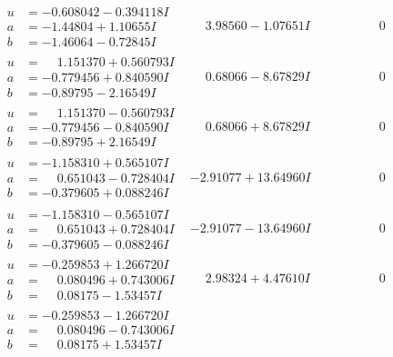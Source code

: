 \documentclass[1p]{elsarticle_modified}
\theoremstyle{definition}
\begin{document}
$$\begin{array}{c|c|c}
 \hline 
\begin{aligned}
u &= -0.608042 - 0.394118 I \\
a &= -1.44804 + 1.10655 I \\
b &= -1.46064 - 0.72845 I\end{aligned}
 & \phantom{-}3.98560 - 1.07651 I & \phantom{-0.000000 } 0 \\ \hline\begin{aligned}
u &= \phantom{-}1.151370 + 0.560793 I \\
a &= -0.779456 + 0.840590 I \\
b &= -0.89795 - 2.16549 I\end{aligned}
 & \phantom{-}0.68066 - 8.67829 I & \phantom{-0.000000 } 0 \\ \hline\begin{aligned}
u &= \phantom{-}1.151370 - 0.560793 I \\
a &= -0.779456 - 0.840590 I \\
b &= -0.89795 + 2.16549 I\end{aligned}
 & \phantom{-}0.68066 + 8.67829 I & \phantom{-0.000000 } 0 \\ \hline\begin{aligned}
u &= -1.158310 + 0.565107 I \\
a &= \phantom{-}0.651043 - 0.728404 I \\
b &= -0.379605 + 0.088246 I\end{aligned}
 & -2.91077 + 13.64960 I & \phantom{-0.000000 } 0 \\ \hline\begin{aligned}
u &= -1.158310 - 0.565107 I \\
a &= \phantom{-}0.651043 + 0.728404 I \\
b &= -0.379605 - 0.088246 I\end{aligned}
 & -2.91077 - 13.64960 I & \phantom{-0.000000 } 0 \\ \hline\begin{aligned}
u &= -0.259853 + 1.266720 I \\
a &= \phantom{-}0.080496 + 0.743006 I \\
b &= \phantom{-}0.08175 - 1.53457 I\end{aligned}
 & \phantom{-}2.98324 + 4.47610 I & \phantom{-0.000000 } 0 \\ \hline\begin{aligned}
u &= -0.259853 - 1.266720 I \\
a &= \phantom{-}0.080496 - 0.743006 I \\
b &= \phantom{-}0.08175 + 1.53457 I\end{aligned}

\end{array}$$
\end{document}

